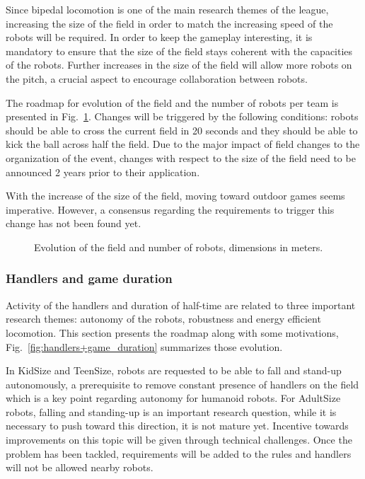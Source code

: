 \documentclass{article}
\begin{document}
Since bipedal locomotion is one of the main research themes of the league,
increasing the size of the field in order to match the increasing speed of the
robots will be required.
In order to keep the gameplay interesting,
it is mandatory to ensure that the size of the field stays coherent with the
capacities of the robots.
Further increases in the size of the field will allow more robots on the pitch,
a crucial aspect to encourage collaboration between robots.

The roadmap for evolution of the field and the number of robots per team
is presented in Fig.~\ref{fig:field_dimensions}.
Changes will be triggered by the following conditions: robots should be able to cross
the current field in 20 seconds and they should be able to kick the ball across half the field.
Due to the major impact of field changes to the organization of the event,
changes with respect to the size of the field need to be announced 2 years prior to their application.

With the increase of the size of the field, moving toward outdoor games seems imperative.
However, a consensus regarding the requirements to trigger this change has not been found yet.

\begin{figure}[htb]
  \centering
  
  \caption{\label{fig:field_dimensions}Evolution of the field and number of robots, dimensions in meters.}
\end{figure}

\subsubsection{Handlers and game duration}
Activity of the handlers and duration of half-time are related to three important research themes:
autonomy of the robots, robustness and energy efficient locomotion.
This section presents the roadmap along with some motivations,
Fig.~\ref{fig:handlers+game_duration} summarizes those evolution.

In KidSize and TeenSize, robots are requested to be able to fall and stand-up autonomously,
a prerequisite to remove constant presence of handlers on the field which is a
key point regarding autonomy for humanoid robots.
For AdultSize robots, falling and standing-up is an important research question,
while it is necessary to push toward this direction, it is not mature yet.
Incentive towards improvements on this topic will be given through technical challenges.
Once the problem has been tackled, requirements will be added to the rules and
handlers will not be allowed nearby robots.
\end{document}
